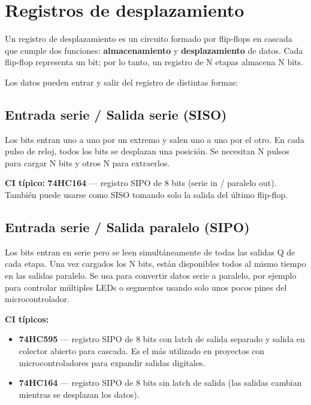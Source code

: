 
\section{Registros de desplazamiento}

Un registro de desplazamiento es un circuito formado por flip-flops en cascada que cumple dos funciones: \textbf{almacenamiento} y \textbf{desplazamiento} de datos. Cada flip-flop representa un bit; por lo tanto, un registro de N etapas almacena N bits.

Los datos pueden entrar y salir del registro de distintas formas:


\subsection{Entrada serie / Salida serie (SISO)}

Los bits entran uno a uno por un extremo y salen uno a uno por el otro. En cada pulso de reloj, todos los bits se desplazan una posición. Se necesitan N pulsos para cargar N bits y otros N para extraerlos.


\begin{notabox}
\textbf{CI típico:} \textbf{74HC164} --- registro SIPO de 8 bits (serie in / paralelo out). También puede usarse como SISO tomando solo la salida del último flip-flop.
\end{notabox}

\subsection{Entrada serie / Salida paralelo (SIPO)}

Los bits entran en serie pero se leen simultáneamente de todas las salidas Q de cada etapa. Una vez cargados los N bits, están disponibles todos al mismo tiempo en las salidas paralelo. Se usa para convertir datos serie a paralelo, por ejemplo para controlar múltiples LEDs o segmentos usando solo unos pocos pines del microcontrolador.

\begin{notabox}
\textbf{CI típicos:}
\begin{itemize}
    \item \textbf{74HC595} --- registro SIPO de 8 bits con latch de salida separado y salida en colector abierto para cascada. Es el más utilizado en proyectos con microcontroladores para expandir salidas digitales.
    \item \textbf{74HC164} --- registro SIPO de 8 bits sin latch de salida (las salidas cambian mientras se desplazan los datos).
\end{itemize}
\end{notabox}

